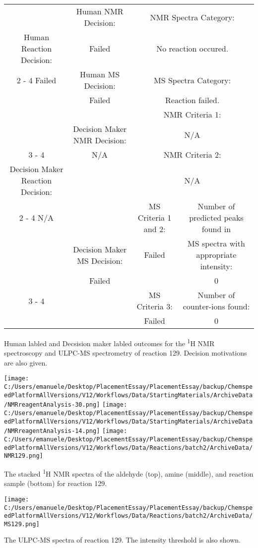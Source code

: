 \documentclass{article}%
\begin{document}
\begin{Decision Table}[H]%
\begin{tabular}{|c|c|c|c|}%
\hline%
&Human NMR Decision:&\multicolumn{2}{|c|}{NMR Spectra Category:}\\%
Human Reaction Decision:&Failed&\multicolumn{2}{|c|}{No reaction occured.}\\%
\cline{2%
-%
4}%
Failed&Human MS Decision:&\multicolumn{2}{|c|}{MS Spectra Category:}\\%
&Failed&\multicolumn{2}{|c|}{Reaction failed.}\\%
\hline%
&&\multicolumn{2}{|c|}{NMR Criteria 1:}\\%
&Decision Maker NMR Decision:&\multicolumn{2}{|c|}{N/A}\\%
\cline{3%
-%
4}%
&N/A&\multicolumn{2}{|c|}{NMR Criteria 2:}\\%
Decision Maker Reaction Decision:&&\multicolumn{2}{|c|}{N/A}\\%
\cline{2%
-%
4}%
N/A&&MS Criteria 1 and 2:&Number of predicted peaks found in\\%
&Decision Maker MS Decision:&Failed&MS spectra with appropriate intensity:\\%
&Failed&&0\\%
\cline{3%
-%
4}%
&&MS Criteria 3:&Number of counter{-}ions found:\\%
&&Failed&0\\%
\hline%
\end{tabular}%
\caption{Human labled and Decsision maker labled outcomes for the \textsuperscript{1}H NMR spectroscopy and ULPC-MS spectrometry of reaction 129. Decision motivations are also given.}%
\end{Decision Table}%
\begin{NMR Spectra}[H]%
\begin{center}%
\texttt{[image: C:/Users/emanuele/Desktop/PlacementEssay/PlacementEssay/backup/ChemspeedPlatformAllVersions/V12/Workflows/Data/StartingMaterials/ArchiveData/NMRreagentAnalysis-30.png]}\hfill%
\texttt{[image: C:/Users/emanuele/Desktop/PlacementEssay/PlacementEssay/backup/ChemspeedPlatformAllVersions/V12/Workflows/Data/StartingMaterials/ArchiveData/NMRreagentAnalysis-14.png]}\hfill%
\texttt{[image: C:/Users/emanuele/Desktop/PlacementEssay/PlacementEssay/backup/ChemspeedPlatformAllVersions/V12/Workflows/Data/Reactions/batch2/ArchiveData/NMR129.png]}\hfill%
\end{center}%
\caption{The stacked \textsuperscript{1}H NMR spectra of the aldehyde (top), amine (middle), and reaction sample (bottom) for reaction 129.}%
\end{NMR Spectra}%
\begin{MS Spectra}[H]%
\begin{center}%
\texttt{[image: C:/Users/emanuele/Desktop/PlacementEssay/PlacementEssay/backup/ChemspeedPlatformAllVersions/V12/Workflows/Data/Reactions/batch2/ArchiveData/MS129.png]}\hfill%
\end{center}%
\caption{The ULPC-MS spectra of reaction 129. The intensity threshold is also shown.}%
\end{MS Spectra}%
\end{document}
